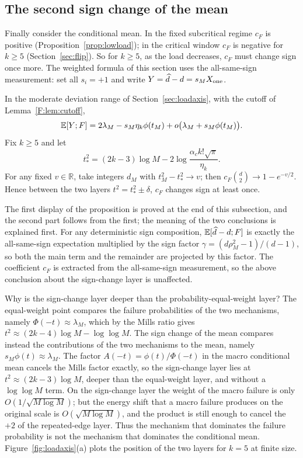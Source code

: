 \subsection{The second sign change of the mean}\label{app:wm}
Finally consider the conditional mean. In the fixed subcritical regime $c_F$ is positive
(Proposition~\ref{prop:lowload}); in the critical window $c_F$ is negative for $k\ge5$
(Section~\ref{sec:flip}). So for $k\ge5$, as the load decreases, $c_F$ must change sign once
more. The weighted formula of this section uses the all-same-sign measurement: set all $s_i=+1$
and write $Y=\widehat d-d=s_MX_{\rm one}$.

\begin{proposition}\label{prop:wm}
In the moderate deviation range of Section~\ref{sec:loadaxis}, with the cutoff of
Lemma~\ref{F:lem:cutoff},
\begin{equation*}
\mathbb E[Y;F]=2\lambda_M-s_M\eta_k\phi(t_M)+o\bigl(\lambda_M+s_M\phi(t_M)\bigr).
\end{equation*}
Fix $k\ge5$ and let
\begin{equation*}
t_*^2=(2k-3)\log M-2\log\frac{\alpha_ck!\sqrt\pi}{\eta_k}.
\end{equation*}
For any fixed $v\in\mathbb R$, take integers $d_M$ with $t_M^2-t_*^2\to v$; then
$c_F\binom d2\to1-e^{-v/2}$. Hence between the two layers $t^2=t_*^2\pm\delta$, $c_F$ changes
sign at least once.
\end{proposition}
The first display of the proposition is proved at the end of this subsection, and the second part
follows from the first; the meaning of the two conclusions is explained first. For any
deterministic sign composition, $\mathbb E[\widehat d-d;F]$ is exactly the all-same-sign expectation
multiplied by the sign factor $\gamma=(d\rho_M^2-1)/(d-1)$, so both the main term and the
remainder are projected by this factor. The coefficient $c_F$ is extracted from the all-same-sign
measurement, so the above conclusion about the sign-change layer is unaffected.

Why is the sign-change layer deeper than the probability-equal-weight layer? The equal-weight point
compares the failure probabilities of the two mechanisms, namely $\Phi(-t)\approx\lambda_M$,
which by the Mills ratio gives $t^2\approx(2k-4)\log M-\log\log M$. The sign change of the mean
compares instead the contributions of the two mechanisms to the mean, namely
$s_M\phi(t)\approx\lambda_M$. The factor $A(-t)=\phi(t)/\Phi(-t)$ in the macro conditional mean
cancels the Mills factor exactly, so the sign-change layer lies at
$t^2\approx(2k-3)\log M$, deeper than the equal-weight layer, and without a $\log\log M$ term. On
the sign-change layer the weight of the macro failure is only $O(1/\sqrt{M\log M})$; but the
energy shift that a macro failure produces on the original scale is $O(\sqrt{M\log M})$, and the
product is still enough to cancel the $+2$ of the repeated-edge layer. Thus the mechanism that
dominates the failure probability is not the mechanism that dominates the conditional mean.
Figure~\ref{fig:loadaxis}(a) plots the position of the two layers for $k=5$ at finite size.

